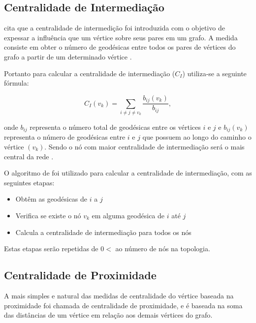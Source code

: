\documentclass[12pt]{article}
\begin{document}
\subsection{Centralidade de Intermediação}
\cite{freitas} cita que a centralidade de intermedição foi introduzida com o objetivo de expessar a influência que um vértice sobre seus pares em um grafo.
A medida consiste em obter o número de geodésicas entre todos os pares de vértices do grafo a partir de um determinado vértice \cite{freitas}.

Portanto para calcular a centralidade de intermediação ($C_I$) utiliza-se a seguinte fórmula: 
\begin{center}
\begin{equation}
C_I(v_k)=\sum_{i\neq j \neq v_{k}} \frac{b_{ij}(v_k)}{b_{ij}},
\end{equation}
\end{center}
onde $b_{ij}$ representa o número total de geodésicas entre os vértices $i$ e $j$ e  $b_{ij}(v_k)$ representa o número de geodésicas entre $i$ e $j$ que possuem ao longo do caminho o vértice $(v_k)$.
Sendo o nó com maior centralidade de intermediação será o mais central da rede \cite{ufimtsev} \cite{freeman}.

O algoritmo de \cite{Brandes01afaster} foi utilizado para calcular a centralidade de intermediação, com as seguintes etapas:
\begin{itemize}
\item Obtêm as geodésicas de $i$ a $j$
\item Verifica se existe o nó $v_k$ em alguma geodésica de $i$ até $j$
\item Calcula a centralidade de intermediação para todos os nós
\end{itemize}
Estas etapas serão repetidas de $0 <$ ao número de nós na topologia.

\subsection{Centralidade de Proximidade}
A mais simples e natural das medidas de centralidade do vértice baseada na proximidade foi chamada de centralidade de proximidade, e é baseada na soma das distâncias de um  vértice em relação aos demais vértices do grafo\cite{freitas}.
\end{document}
